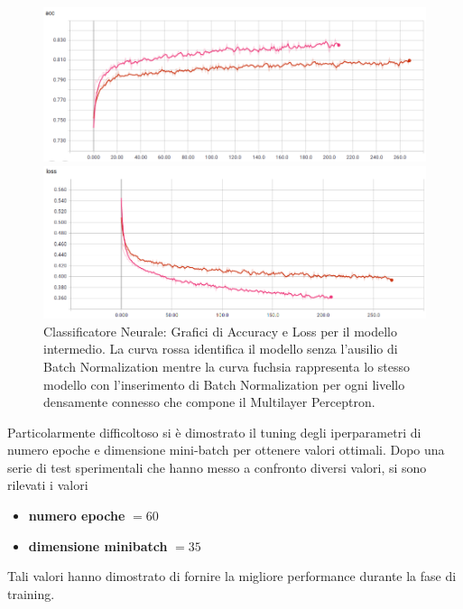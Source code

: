 \begin{figure}[!bp] 
	\begin{minipage}[t]{\linewidth}
		\includegraphics[width=\linewidth]{figures/MLP_batchnorm1.png}
	\end{minipage}\hfill
	\begin{minipage}[b]{\linewidth}
		\includegraphics[width=\linewidth]{figures/MLP_batchnorm2.png}
	\end{minipage}
	\caption{Classificatore Neurale: Grafici di Accuracy e Loss per il modello intermedio. La curva rossa identifica il modello senza l'ausilio di Batch Normalization mentre la curva fuchsia rappresenta lo stesso modello con l'inserimento di Batch Normalization per ogni livello densamente connesso che compone il Multilayer Perceptron. \label{fig:batchnorm}}
\end{figure}

Particolarmente difficoltoso si è dimostrato il tuning degli  iperparametri di numero epoche e dimensione mini-batch per ottenere valori ottimali. Dopo una serie di test sperimentali che hanno messo a confronto diversi valori, si sono rilevati i valori
\begin{itemize}
\item \textbf{numero epoche} $= 60$
\item \textbf{dimensione minibatch} $= 35$ 
\end{itemize}

Tali valori hanno dimostrato di fornire la migliore performance durante la fase di training.

